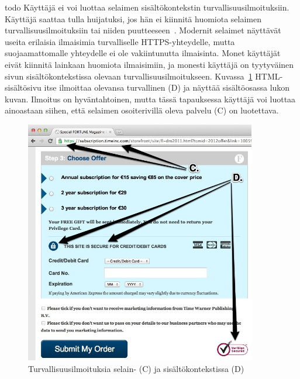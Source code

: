 \documentclass[finnish,gradu]{tktltiki}
\begin{document}
  todo
  Käyttäjä ei voi luottaa selaimen sisältökontekstin turvallisuusilmoituksiin. Käyttäjä saattaa tulla huijatuksi, jos hän ei kiinnitä huomiota selaimen turvallisuusilmoituksiin tai niiden puutteeseen~\cite{why_phishing_works_06}. Modernit selaimet näyttävät useita erilaisia ilmaisimia turvalliselle HTTPS-yhteydelle, mutta suojaamattomalle yhteydelle ei ole vakiintunutta ilmaisinta. Monet käyttäjät eivät kiinnitä lainkaan huomiota ilmaisimiin, ja monesti käyttäjä on tyytyväinen sivun sisältökontekstissa olevaan turvallisuusilmoitukseen. Kuvassa~\ref{fig:trust_context_html} HTML-sisältösivu itse ilmoittaa olevansa turvallinen (D) ja näyttää sisältöosassa lukon kuvan. Ilmoitus on hyväntahtoinen, mutta tässä tapauksessa käyttäjä voi luottaa ainoastaan siihen, että selaimen osoiterivillä oleva palvelu (C) on luotettava.

  \begin{figure}
    \centering
    \includegraphics[width=0.9\textwidth]{images/trust_context_html.jpg}
    \caption{Turvallisuusilmoituksia selain- (C) ja sisältökontekstissa (D)}
    \label{fig:trust_context_html}
  \end{figure}


\end{document}
